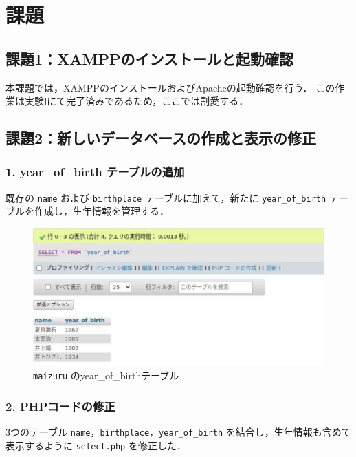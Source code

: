 \section{課題}

\subsection*{課題1：XAMPPのインストールと起動確認}

本課題では，XAMPPのインストールおよびApacheの起動確認を行う．
この作業は実験Ⅰにて完了済みであるため，ここでは割愛する．

\subsection*{課題2：新しいデータベースの作成と表示の修正}

\subsubsection*{1. year\_of\_birth テーブルの追加}

既存の \texttt{name} および \texttt{birthplace} テーブルに加えて，新たに \texttt{year\_of\_birth} テーブルを作成し，生年情報を管理する．

\begin{figure}[htbp]
    \centering
    \includegraphics[width=0.9\linewidth]{figure/5.pdf}
    \caption{\texttt{maizuru} のyear\_of\_birthテーブル}
\end{figure}

\subsubsection*{2. PHPコードの修正}

3つのテーブル \texttt{name}，\texttt{birthplace}，\texttt{year\_of\_birth} を結合し，生年情報も含めて表示するように \texttt{select.php} を修正した．

